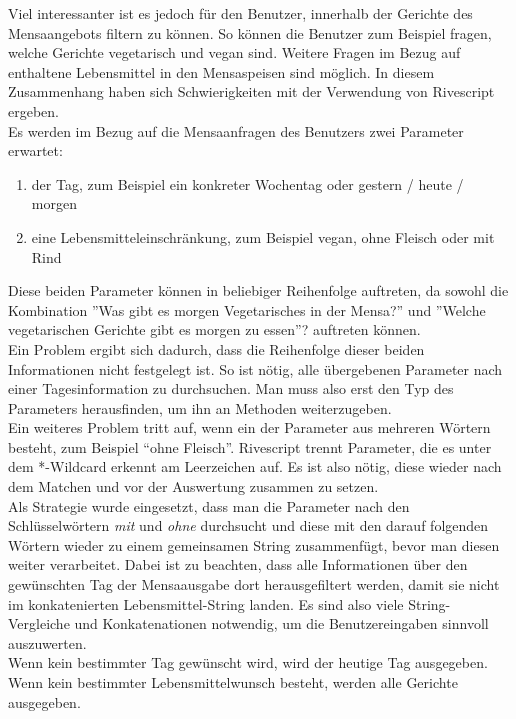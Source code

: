 Viel interessanter ist es jedoch für den Benutzer, innerhalb der Gerichte des Mensaangebots filtern zu können. So können die Benutzer zum Beispiel fragen, welche Gerichte vegetarisch und vegan sind. Weitere Fragen im Bezug auf enthaltene Lebensmittel in den Mensaspeisen sind möglich.
In diesem Zusammenhang haben sich Schwierigkeiten mit der Verwendung von Rivescript ergeben. \\
Es werden im Bezug auf die Mensaanfragen des Benutzers zwei Parameter erwartet:
\begin{enumerate}[noitemsep]
    \item der Tag, zum Beispiel ein konkreter Wochentag oder gestern / heute / morgen
    \item eine Lebensmitteleinschränkung, zum Beispiel vegan, ohne Fleisch oder mit Rind 
\end{enumerate}
Diese beiden Parameter können in beliebiger Reihenfolge auftreten, da sowohl die Kombination 
''Was gibt es morgen Vegetarisches in der Mensa?'' und
''Welche vegetarischen Gerichte gibt es morgen zu essen''?
auftreten können. \\
Ein Problem ergibt sich dadurch, dass die Reihenfolge dieser beiden Informationen nicht festgelegt ist. So ist nötig, alle übergebenen Parameter nach einer Tagesinformation zu durchsuchen. Man muss also erst den Typ des Parameters herausfinden, um ihn an Methoden weiterzugeben. \\
Ein weiteres Problem tritt auf, wenn ein der Parameter aus mehreren Wörtern besteht, zum Beispiel “ohne Fleisch”. Rivescript trennt Parameter, die es unter dem *-Wildcard erkennt am Leerzeichen auf. Es ist also nötig, diese wieder nach dem Matchen und vor der Auswertung zusammen zu setzen. \\
Als Strategie wurde eingesetzt, dass man die Parameter nach den Schlüsselwörtern \emph{mit} und \emph{ohne} durchsucht und diese mit den darauf folgenden Wörtern wieder zu einem gemeinsamen String zusammenfügt, bevor man diesen weiter verarbeitet. Dabei ist zu beachten, dass alle Informationen über den gewünschten Tag der Mensaausgabe dort herausgefiltert werden, damit sie nicht im konkatenierten Lebensmittel-String landen. Es sind also viele String-Vergleiche und Konkatenationen notwendig, um die Benutzereingaben sinnvoll auszuwerten. \\
Wenn kein bestimmter Tag gewünscht wird, wird der heutige Tag ausgegeben. Wenn kein bestimmter Lebensmittelwunsch besteht, werden alle Gerichte ausgegeben.

